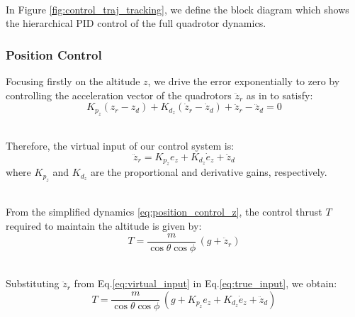 \documentclass[main]{subfiles}
\begin{document}
\noindent\\
In Figure \ref{fig:control_traj_tracking}, we define the block
diagram which shows the hierarchical PID control of the full 
quadrotor dynamics.

\subsubsection{Position Control}
Focusing firstly on the altitude $z$,
we drive the error exponentially to zero by controlling the acceleration
vector of the quadrotors $\ddot{z}_r$ as in \cite{simplified_model} to satisfy:
\[
 K_{p_z} ( z_r - z_d )  + K_{d_z} (\dot{z}_r - \dot{z}_d ) + \ddot{z}_r - \ddot{z}_d = 0
\]

\noindent\\
Therefore, the virtual input of our control system is:
\begin{equation}
 \ddot{z}_r  =  K_{p_z} e_z + K_{d_z} \dot{e}_z + \ddot{z}_d
    \label{eq:virtual_input}
\end{equation}
where \( K_{p_z} \) and \( K_{d_z} \) are the  proportional and derivative gains, respectively.

\noindent\\
From the simplified dynamics \eqref{eq:position_control_z}, 
the control thrust \( T \) required to maintain the altitude is given by:
\begin{equation}
 T = \frac{m}{\cos\theta \cos\phi} \, (g + \ddot{z}_r)
    \label{eq:true_input}
\end{equation}

\noindent\\
Substituting \( \ddot{z}_r \) from Eq.\ref{eq:virtual_input} in Eq.\ref{eq:true_input},
we obtain:
\begin{equation}
 T = \frac{m}{\cos\theta \cos\phi} \, \left( g + K_{p_z} e_z + K_{d_z} \dot{e}_z + \ddot{z}_d \right)
    \label{eq:desired_thrust}
\end{equation}
\end{document}

